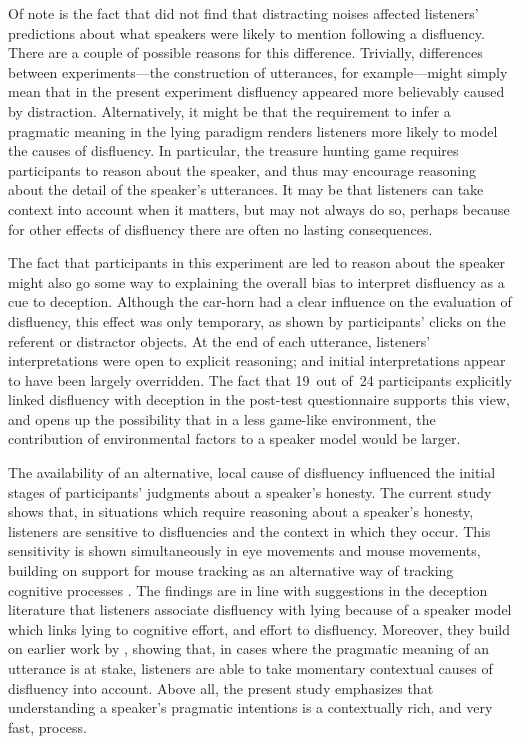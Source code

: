 \documentclass[a4paper,man,natbib]{apa6}
\begin{document}
Of note is the fact that \citet[][Experiment~3]{Arnold2007} did not find that distracting noises affected listeners' predictions about what speakers were likely to mention following a disfluency.
There are a couple of possible reasons for this difference.
Trivially, differences between experiments---the construction of utterances, for example---might simply mean that in the present experiment disfluency appeared more believably caused by distraction.
Alternatively, it might be that the requirement to infer a pragmatic meaning in the lying paradigm renders listeners more likely to model the causes of disfluency.
In particular, the treasure hunting game requires participants to reason about the speaker, and thus may encourage reasoning about the detail of the speaker's utterances.
It may be that listeners can take context into account when it matters, but may not always do so, perhaps because for other effects of disfluency there are often no lasting consequences.

The fact that participants in this experiment are led to reason about the speaker might also go some way to explaining the overall bias to interpret disfluency as a cue to deception.
Although the car-horn had a clear influence on the evaluation of disfluency, this effect was only temporary, as shown by participants' clicks on the referent or distractor objects.
At the end of each utterance, listeners' interpretations were open to explicit reasoning; and initial interpretations appear to have been largely overridden.
The fact that 19~out of~24 participants explicitly linked disfluency with deception in the post-test questionnaire supports this view, and opens up the possibility that in a less game-like environment, the contribution of environmental factors to a speaker model would be larger.

The availability of an alternative, local cause of disfluency influenced the initial stages of participants' judgments about a speaker's honesty. 
The current study shows that, in situations which require reasoning about a speaker's honesty, listeners are sensitive to disfluencies and the context in which they occur.
This sensitivity is shown simultaneously in eye movements and mouse movements, building on support for mouse tracking as an alternative way of tracking cognitive processes \citep[e.g.,][]{farmer07}.
The findings are in line with suggestions in the deception literature that listeners associate disfluency with lying because of a speaker model which links lying to cognitive effort, and effort to disfluency.
Moreover, they build on earlier work by \citet{Arnold2007}, showing that, in cases where the pragmatic meaning of an utterance is at stake, listeners are able to take momentary contextual causes of disfluency into account.
Above all, the present study emphasizes that understanding a speaker's pragmatic intentions is a contextually rich, and very fast, process. 




\end{document}
